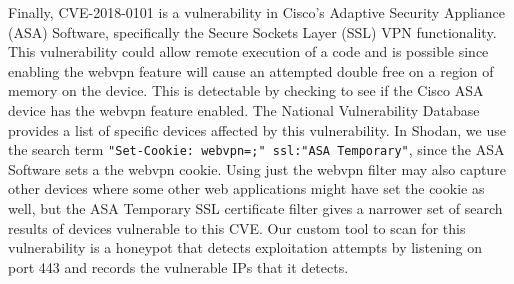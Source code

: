 Finally, CVE-2018-0101 is a vulnerability in Cisco's Adaptive Security Appliance (ASA)
Software, specifically the Secure Sockets Layer (SSL) VPN functionality. This
vulnerability could allow remote execution of a code and is possible since
enabling the webvpn feature will cause an attempted double free on a region
of memory on the device. This is detectable by checking to see if the Cisco
ASA device has the webvpn feature enabled. The National Vulnerability Database
provides a list of specific devices affected by this vulnerability\cite{CVE-2018-0101}. In Shodan,
we use the search term \verb|"Set-Cookie: webvpn=;" ssl:"ASA Temporary"|,
since the ASA Software sets a the webvpn cookie. Using just the webvpn filter
may also capture other devices where some other web applications might have
set the cookie as well, but the ASA Temporary SSL certificate filter gives
a narrower set of search results of devices vulnerable to this CVE. Our custom
tool to scan for this vulnerability is a honeypot that detects exploitation
attempts by listening on port 443 and records the vulnerable IPs that it
detects.
